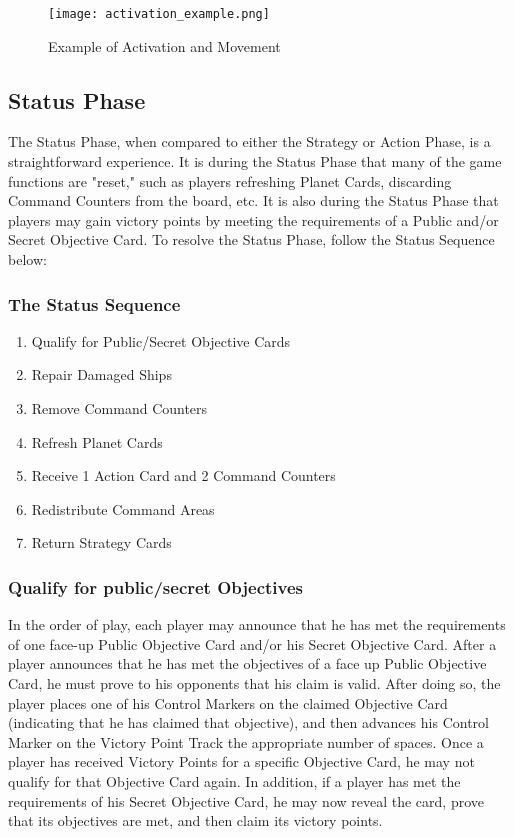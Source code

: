 \documentclass[11pt,fleqn]{book} %
\begin{document}
\begin{figure}[h]
\centering
\texttt{[image: activation\_example.png]}
\caption{ Example of Activation and Movement}
\label{fig:example_activation}
\end{figure}

\subsection{Status Phase} %
\label{sub:status_phase}

The Status Phase, when compared to either the Strategy or Action Phase, is a straightforward experience. It is during the Status Phase that many of the game functions are "reset," such as players refreshing Planet Cards, discarding Command Counters from the board, etc. It is also during the Status Phase that players may gain victory points by meeting the requirements of a Public and/or Secret Objective Card. To resolve the Status Phase, follow the Status Sequence below:
\subsubsection{The Status Sequence}
\begin{enumerate}
    \item  Qualify for Public/Secret Objective Cards
\item Repair Damaged Ships
\item Remove Command Counters
\item Refresh Planet Cards
\item Receive 1 Action Card and 2 Command Counters
\item Redistribute Command Areas
\item Return Strategy Cards
\end{enumerate}

\subsubsection{Qualify for public/secret Objectives} %
\label{sub:qualify_for_public_secret_objectives}        
In the order of play, each player may announce that he has met the requirements of one face-up Public Objective Card and/or his Secret Objective Card.
After a player announces that he has met the objectives of a face up Public Objective Card, he must prove to his opponents that his claim is valid.
After doing so, the player places one of his Control Markers on the claimed Objective Card (indicating that he has claimed that objective), and then advances his Control Marker on the Victory Point Track the appropriate number of spaces.
Once a player has received Victory Points for a specific Objective Card, he may not qualify for that Objective Card again.
In addition, if a player has met the requirements of his Secret Objective Card, he may now reveal the card, prove that its objectives are met, and then claim its victory points.
\end{document}
